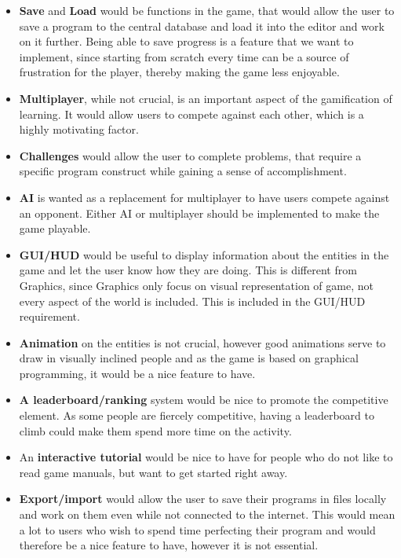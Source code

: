 \begin{itemize}
	\item \textbf{Save} and \textbf{Load} would be functions in the game, that would allow the user to save a program to the central database and load it into the editor and work on it further.
	Being able to save progress is a feature that we want to implement, since starting from scratch every time can be a source of frustration for the player, thereby making the game less enjoyable.
	\item \textbf{Multiplayer}, while not crucial, is an important aspect of the gamification of learning.
	It would allow users to compete against each other, which is a highly motivating factor.
	\item \textbf{Challenges} would allow the user to complete problems, that require a specific program construct while gaining a sense of accomplishment.
	\item \textbf{AI} is wanted as a replacement for multiplayer to have users compete against an opponent.
	Either AI or multiplayer should be implemented to make the game playable.
	\item \textbf{GUI/HUD} would be useful to display information about the entities in the game and let the user know how they are doing.
	This is different from Graphics, since Graphics only focus on visual representation of game, not every aspect of the world is included.
	This is included in the GUI/HUD 
requirement.
\end{itemize}

\begin{itemize}
	\item \textbf{Animation} on the entities is not crucial, however good animations serve to draw in visually inclined people and as the game is based on graphical programming, it would be a nice feature to have.
	\item \textbf{A leaderboard/ranking} system would be nice to promote the competitive element.
	As some people are fiercely competitive, having a leaderboard to climb could make them spend more time on the activity.
	\item An \textbf{interactive tutorial} would be nice to have for people who do not like to read game manuals, but want to get started right away.
	\item \textbf{Export/import} would allow the user to save their programs in files locally and work on them even while not connected to the internet.
	This would mean a lot to users who wish to spend time perfecting their program and would therefore be a nice feature to have, however it is not essential.
\end{itemize}